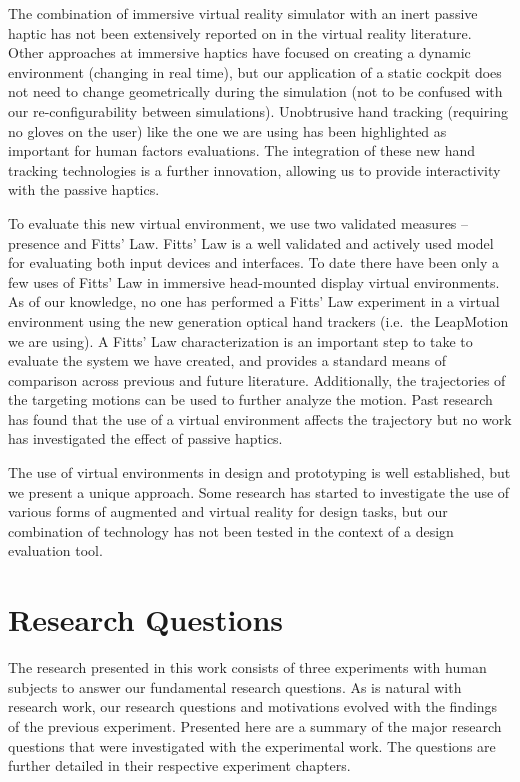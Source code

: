 The combination of immersive virtual reality simulator with an inert passive haptic has not been extensively reported on in the virtual reality literature.
Other approaches at immersive haptics have focused on creating a dynamic environment (changing in real time), but our application of a static cockpit does not need to change geometrically during the simulation (not to be confused with our re-configurability between simulations).
Unobtrusive hand tracking (requiring no gloves on the user) like the one we are using has been highlighted as important for human factors evaluations.
The integration of these new hand tracking technologies is a further innovation, allowing us to provide interactivity with the passive haptics.

To evaluate this new virtual environment, we use two validated measures -- presence and Fitts' Law.
Fitts' Law is a well validated and actively used model for evaluating both input devices and interfaces.
To date there have been only a few uses of Fitts' Law in immersive head-mounted display virtual environments.
As of our knowledge, no one has performed a Fitts' Law experiment in a virtual environment using the new generation optical hand trackers (i.e.\ the LeapMotion we are using).
A Fitts' Law characterization is an important step to take to evaluate the system we have created, and provides a standard means of comparison across previous and future literature.
Additionally, the trajectories of the targeting motions can be used to further analyze the motion.
Past research has found that the use of a virtual environment affects the trajectory but no work has investigated the effect of passive haptics.

The use of virtual environments in design and prototyping is well established, but we present a unique approach.
Some research has started to investigate the use of various forms of augmented and virtual reality for design tasks, but our combination of technology has not been tested in the context of a design evaluation tool.

\section{Research Questions}
\label{hypotheses}

The research presented in this work consists of three experiments with human subjects to answer our fundamental research questions.
As is natural with research work, our research questions and motivations evolved with the findings of the previous experiment.
Presented here are a summary of the major research questions that were investigated with the experimental work.
The questions are further detailed in their respective experiment chapters.

